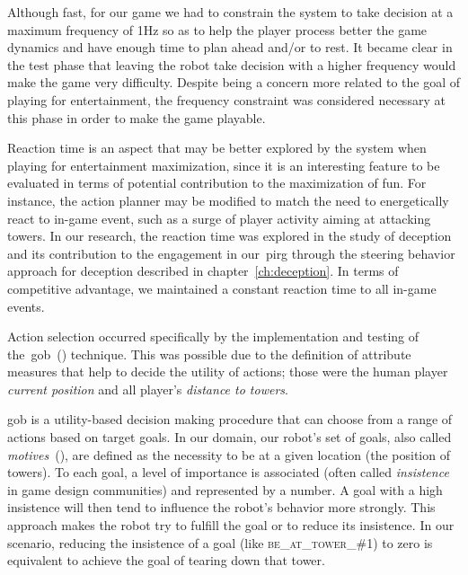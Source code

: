 Although fast, for our game we had to constrain the system to take decision at a maximum frequency of 1Hz so as to help the player process better the game dynamics and have enough time to plan ahead and/or to rest. It became clear in the test phase that leaving the robot take decision with a higher frequency would make the game very difficulty. Despite being a concern more related to the goal of playing for entertainment, the frequency constraint was considered necessary at this phase in order to make the game playable. 



Reaction time is an aspect that may be better explored by the system when playing for entertainment maximization, since it is an interesting feature to be evaluated in terms of potential contribution to the maximization of fun. For instance, the action planner may be modified to match the need to energetically react to in-game event, such as a surge of player activity aiming at attacking towers. In our research, the reaction time was explored in the study of deception and its contribution to the engagement in our~\gls{pirg} through the steering behavior approach for deception described in chapter~\ref{ch:deception}. In terms of competitive advantage, we maintained a constant reaction time to all in-game events.

Action selection occurred specifically by the implementation and testing of the~\gls{gob}~(\cite{millington_artificial_2009}) technique. This was possible due to the definition of attribute measures that help to decide the utility of actions; those were the human player \textit{current position} and all player's \textit{distance to towers}.

\glsdesc{gob} is a utility-based decision making procedure that can choose from a range of actions based on target goals. In our domain, our robot's set of goals, also called \textit{motives}~(\cite{millington_artificial_2009}), are defined as the necessity to be at a given location (the position of towers). To each goal, a level of importance is associated (often called \textit{insistence} in game design communities) and represented by a number. A goal with a high insistence will then tend to influence the robot's behavior more strongly. This approach makes the robot try to fulfill the goal or to reduce its insistence. In our scenario, reducing the insistence of a goal (like \textsc{be\_at\_tower\_\#1}) to zero is equivalent to achieve the goal of tearing down that tower. 

